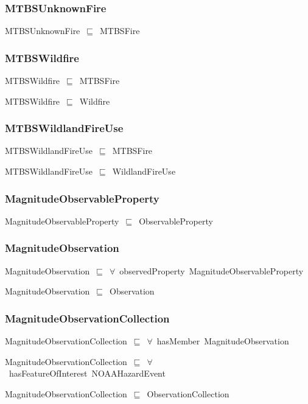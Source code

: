 \documentclass{article}
\begin{document}
\subsubsection*{MTBSUnknownFire}

MTBSUnknownFire~\ensuremath{\sqsubseteq}~MTBSFire~

\subsubsection*{MTBSWildfire}

MTBSWildfire~\ensuremath{\sqsubseteq}~MTBSFire~

MTBSWildfire~\ensuremath{\sqsubseteq}~Wildfire~

\subsubsection*{MTBSWildlandFireUse}

MTBSWildlandFireUse~\ensuremath{\sqsubseteq}~MTBSFire~

MTBSWildlandFireUse~\ensuremath{\sqsubseteq}~WildlandFireUse~

\subsubsection*{MagnitudeObservableProperty}

MagnitudeObservableProperty~\ensuremath{\sqsubseteq}~ObservableProperty~

\subsubsection*{MagnitudeObservation}

MagnitudeObservation~\ensuremath{\sqsubseteq}~\ensuremath{\forall}~observedProperty~MagnitudeObservableProperty~

MagnitudeObservation~\ensuremath{\sqsubseteq}~Observation~

\subsubsection*{MagnitudeObservationCollection}

MagnitudeObservationCollection~\ensuremath{\sqsubseteq}~\ensuremath{\forall}~hasMember~MagnitudeObservation~

MagnitudeObservationCollection~\ensuremath{\sqsubseteq}~\ensuremath{\forall}~hasFeatureOfInterest~NOAAHazardEvent~

MagnitudeObservationCollection~\ensuremath{\sqsubseteq}~ObservationCollection~
\end{document}
